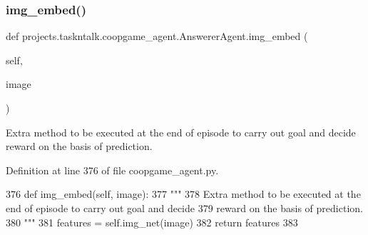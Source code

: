\mbox{\label{classprojects_1_1taskntalk_1_1coopgame__agent_1_1AnswererAgent_a866af3a411fe6c7d10e34306ea0d681b}} 
\subsubsection{\texorpdfstring{img\+\_\+embed()}{img\_embed()}}
{\footnotesize\ttfamily def projects.\+taskntalk.\+coopgame\+\_\+agent.\+Answerer\+Agent.\+img\+\_\+embed (\begin{DoxyParamCaption}\item[{}]{self,  }\item[{}]{image }\end{DoxyParamCaption})}

\begin{DoxyVerb}Extra method to be executed at the end of episode to carry out goal and decide
reward on the basis of prediction.
\end{DoxyVerb}
 

Definition at line 376 of file coopgame\+\_\+agent.\+py.


\begin{DoxyCode}
376     \textcolor{keyword}{def }img\_embed(self, image):
377         \textcolor{stringliteral}{"""}
378 \textcolor{stringliteral}{        Extra method to be executed at the end of episode to carry out goal and decide}
379 \textcolor{stringliteral}{        reward on the basis of prediction.}
380 \textcolor{stringliteral}{        """}
381         features = self.img\_net(image)
382         \textcolor{keywordflow}{return} features
383 \end{DoxyCode}
\mbox{\label{classprojects_1_1taskntalk_1_1coopgame__agent_1_1AnswererAgent_ae75c09cc8f494a77e625a577fea676ec}} 
